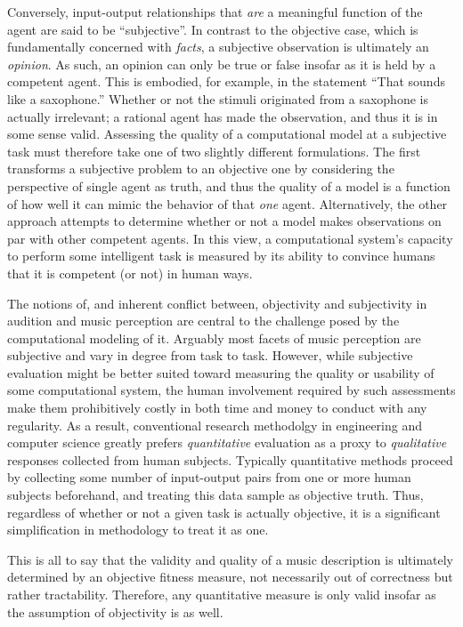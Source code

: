 Conversely, input-output relationships that \emph{are} a meaningful function of the agent are said to be ``subjective''.
In contrast to the objective case, which is fundamentally concerned with \emph{facts}, a subjective observation is ultimately an \emph{opinion}.
As such, an opinion can only be true or false insofar as it is held by a competent agent.
This is embodied, for example, in the statement ``That sounds like a saxophone.''
Whether or not the stimuli originated from a saxophone is actually irrelevant;
a rational agent has made the observation, and thus it is in some sense valid.
Assessing the quality of a computational model at a subjective task must therefore take one of two slightly different formulations.
The first transforms a subjective problem to an objective one by considering the perspective of single agent as truth, and thus the quality of a model is a function of how well it can mimic the behavior of that \emph{one} agent.
Alternatively, the other approach attempts to determine whether or not a model makes observations on par with other competent agents. %
In this view, a computational system's capacity to perform some intelligent task is measured by its ability to convince humans that it is competent (or not) in human ways.

The notions of, and inherent conflict between, objectivity and subjectivity in audition and music perception are central to the challenge posed by the computational modeling of it.
Arguably most facets of music perception are subjective and vary in degree from task to task.
However, while subjective evaluation might be better suited toward measuring the quality or usability of some computational system, the human involvement required by such assessments make them prohibitively costly in both time and money to conduct with any regularity.
As a result, conventional research methodolgy in engineering and computer science greatly prefers \emph{quantitative} evaluation as a proxy to \emph{qualitative} responses collected from human subjects.
Typically quantitative methods proceed by collecting some number of input-output pairs from one or more human subjects beforehand, and treating this data sample as objective truth.
Thus, regardless of whether or not a given task is actually objective, it is a significant simplification in methodology to treat it as one.

This is all to say that the validity and quality of a music description is ultimately determined by an objective fitness measure, not necessarily out of correctness but rather tractability.
Therefore, any quantitative measure is only valid insofar as the assumption of objectivity is as well.


